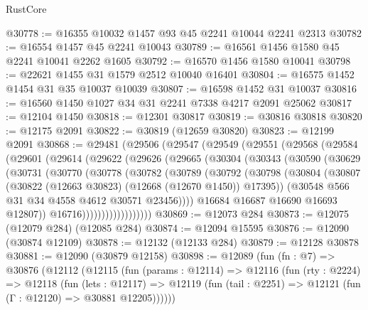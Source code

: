 \begin{lexlean}{RustCore}
\begin{coremodule}
@30778 := @16355 @10032 @1457 @93 @45 @2241 @10044 @2241 @2313
@30782 := @16554 @1457 @45 @2241 @10043
@30789 := @16561 @1456 @1580 @45 @2241 @10041 @2262 @1605
@30792 := @16570 @1456 @1580 @10041
@30798 := @22621 @1455 @31 @1579 @2512 @10040 @16401
@30804 := @16575 @1452 @1454 @31 @35 @10037 @10039
@30807 := @16598 @1452 @31 @10037
@30816 := @16560 @1450 @1027 @34 @31 @2241 @7338 @4217 @2091 @25062
@30817 := @12104 @1450
@30818 := @12301 @30817
@30819 := @30816 @30818
@30820 := @12175 @2091
@30822 := @30819 (@12659 @30820)
@30823 := @12199 @2091
@30868 := @29481
    (@29506
      (@29547
        (@29549
          (@29551
            (@29568
              (@29584
                (@29601
                  (@29614
                    (@29622
                      (@29626
                        (@29665
                          (@30304
                            (@30343
                              (@30590
                                (@30629
                                  (@30731
                                    (@30770
                                      (@30778
                                        (@30782
                                          (@30789
                                            (@30792
                                              (@30798
                                                (@30804
                                                  (@30807
                                                    (@30822
                                                      (@12663 @30823)
                                                      (@12668 (@12670 @1450))
                                                      @17395))
                                                  (@30548 @566 @31 @34 @4558 @4612 @30571 @23456))))
                                            @16684
                                            @16687
                                            @16690
                                            @16693
                                            @12807))
                                        @16716))))))))))))))))))
@30869 := @12073 @284
@30873 := @12075 (@12079 @284) (@12085 @284)
@30874 := @12094 @15595
@30876 := @12090 (@30874 @12109)
@30878 := @12132 (@12133 @284)
@30879 := @12128 @30878
@30881 := @12090 (@30879 @12158)
@30898 := @12089
    (fun (fn : @7) =>
    @30876
      (@12112
        (@12115
          (fun (params : @12114) =>
          @12116
            (fun (rty : @2224) =>
            @12118
              (fun (lets : @12117) =>
              @12119 (fun (tail : @2251) => @12121 (fun (Γ : @12120) => @30881 @12205))))))

\end{coremodule}
\end{lexlean}
